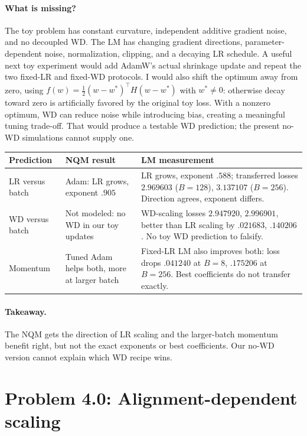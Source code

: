 \documentclass{article}
\begin{document}
\paragraph{What is missing?} The toy problem has constant curvature,
independent additive gradient noise, and no decoupled WD. The LM has
changing gradient directions, parameter-dependent noise, normalization,
clipping, and a decaying LR schedule. A useful next toy experiment would
add AdamW's actual shrinkage update and repeat the two fixed-LR and
fixed-WD protocols. I would also shift the optimum away from zero, using
$f(w)=\tfrac12(w-w^*)^\top H(w-w^*)$ with $w^*\ne0$:
otherwise decay toward zero is artificially favored by the original toy
loss. With a nonzero optimum, WD can reduce noise while introducing bias,
creating a meaningful tuning trade-off. That would produce a testable
WD prediction; the present no-WD simulations cannot supply one.

\begin{center}
\small
\begin{tabular}{p{}p{}p{}}
\toprule
Prediction & NQM result & LM measurement \\
\midrule
LR versus batch & Adam: LR grows, exponent $.905$ & LR grows, exponent $.588$;
transferred losses $2.969603$ ($B=128$), $3.137107$ ($B=256$). Direction agrees, exponent differs. \\
WD versus batch & Not modeled: no WD in our toy updates & WD-scaling losses
$2.947920$, $2.996901$, better than LR scaling by $.021683$, $.140206$. No toy WD prediction to falsify. \\
Momentum & Tuned Adam helps both, more at larger batch & Fixed-LR LM also improves both:
loss drops $.041240$ at $B=8$, $.175206$ at $B=256$. Best coefficients do not transfer exactly. \\
\bottomrule
\end{tabular}
\end{center}

\paragraph{Takeaway.} The NQM gets the direction of LR scaling and the
larger-batch momentum benefit right, but not the exact exponents or best
coefficients. Our no-WD version cannot explain which WD recipe wins.

\section{Problem 4.0: Alignment-dependent scaling}
\end{document}

